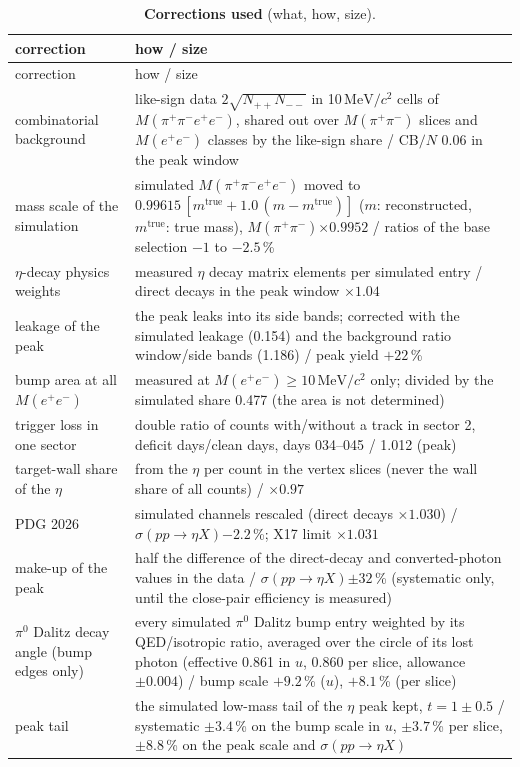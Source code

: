 \documentclass[11pt,a4paper]{article}
\renewcommand{\arraystretch}{1.15}
\newcommand{\piz}{\ensuremath{\pi^{0}}\xspace}
\newcommand{\Mfour}{\ensuremath{M(\pi^{+}\pi^{-}e^{+}e^{-})}\xspace}
\newcommand{\Mee}{\ensuremath{M(e^{+}e^{-})}\xspace}
\newcommand{\Mpipi}{\ensuremath{M(\pi^{+}\pi^{-})}\xspace}
\newcommand{\MeVcc}{\ensuremath{\mathrm{MeV}/c^{2}}\xspace}
\newcommand{\sigeta}{\ensuremath{\sigma(pp\to\eta X)}\xspace}
\begin{document}
{\footnotesize
\setlength{\tabcolsep}{4pt}
\renewcommand{\arraystretch}{1.0}
\begin{longtable}{@{}>{\raggedright\arraybackslash}p{3.6cm} >{\raggedright\arraybackslash}p{\dimexpr\textwidth-3.6cm-2\tabcolsep\relax}@{}}
\caption{\textbf{Corrections used} (what, how, size).}\label{tab:corr}\\
\toprule
correction & how / size \\
\midrule
\endfirsthead
\toprule
correction & how / size \\
\midrule
\endhead
\bottomrule
\endfoot
combinatorial background & like-sign data $2\sqrt{N_{++}N_{--}}$ in 10\,\MeVcc cells of \Mfour, shared out over \Mpipi slices and \Mee classes by the like-sign share / CB$/N$ 0.06 in the peak window \\
mass scale of the simulation & simulated \Mfour moved to $0.99615\,[m^{\mathrm{true}}+1.0\,(m-m^{\mathrm{true}})]$ ($m$: reconstructed, $m^{\mathrm{true}}$: true mass), \Mpipi$\times0.9952$ / ratios of the base selection $-1$ to $-2.5$\,\% \\
$\eta$-decay physics weights & measured $\eta$ decay matrix elements per simulated entry / direct decays in the peak window $\times1.04$ \\
leakage of the peak & the peak leaks into its side bands; corrected with the simulated leakage (0.154) and the background ratio window/side bands (1.186) / peak yield $+22$\,\% \\
bump area at all \Mee & measured at \Mee$\ge10$\,\MeVcc only; divided by the simulated share 0.477 (the area is not determined) \\
trigger loss in one sector & double ratio of counts with/without a track in sector 2, deficit days/clean days, days 034--045 / 1.012 (peak) \\
target-wall share of the $\eta$ & from the $\eta$ per count in the vertex slices (never the wall share of all counts) / $\times0.97$ \\
PDG 2026 & simulated channels rescaled (direct decays $\times1.030$) / \sigeta $-2.2$\,\%; X17 limit $\times1.031$ \\
make-up of the peak & half the difference of the direct-decay and converted-photon values in the data / \sigeta $\pm32$\,\% (systematic only, until the close-pair efficiency is measured) \\
\piz Dalitz decay angle (bump edges only) & every simulated \piz Dalitz bump entry weighted by its QED/isotropic ratio, averaged over the circle of its lost photon (effective 0.861 in $u$, 0.860 per slice, allowance $\pm0.004$) / bump scale $+9.2$\,\% ($u$), $+8.1$\,\% (per slice) \\
peak tail & the simulated low-mass tail of the $\eta$ peak kept, $t=1\pm0.5$ / systematic $\pm3.4$\,\% on the bump scale in $u$, $\pm3.7$\,\% per slice, $\pm8.8$\,\% on the peak scale and \sigeta \\
\end{longtable}
}
\end{document}
